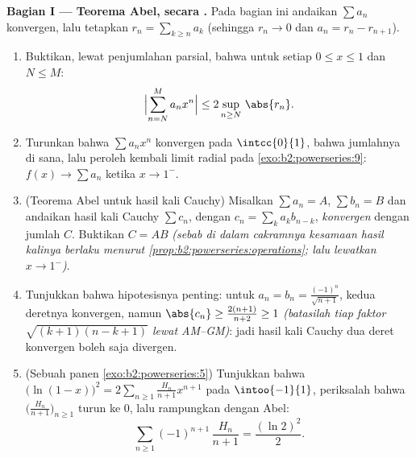 \begin{problem}
\medskip
\noindent\textbf{Bagian I --- Teorema Abel, secara .} Pada
bagian ini andaikan $\sum a_n$ konvergen, lalu tetapkan $r_n =
\sum_{k\geq n} a_k$ (sehingga $r_n \to 0$ dan $a_n = r_n - r_{n+1}$).
\begin{enumerate}
  \item Buktikan, lewat penjumlahan parsial, bahwa untuk setiap $0 \leq
        x \leq 1$ dan $N \leq M$:
        \[
        \Bigl|\sum_{n=N}^{M} a_n x^n\Bigr|
        \leq 2\sup_{n \geq N}\,\abs{r_n} .
        \]
  \item Turunkan bahwa $\sum a_nx^n$ konvergen \emph{} pada
        $\intcc{0}{1}$, bahwa jumlahnya  di sana, lalu
        peroleh kembali limit radial pada
        \cref{exo:b2:powerseries:9}: $f(x) \to \sum a_n$ ketika $x
        \to 1^-$.
  \item (Teorema Abel untuk hasil kali Cauchy) Misalkan $\sum a_n = A$,
        $\sum b_n = B$ dan andaikan hasil kali Cauchy $\sum
        c_n$, dengan $c_n = \sum_{k} a_kb_{n-k}$, \emph{konvergen}
        dengan jumlah $C$. Buktikan $C = AB$ \emph{(sebab di dalam
        cakramnya kesamaan hasil kalinya berlaku menurut
        \cref{prop:b2:powerseries:operations}; lalu lewatkan $x \to
        1^-$)}.
  \item Tunjukkan bahwa hipotesisnya penting: untuk $a_n = b_n =
        \frac{(-1)^n}{\sqrt{n+1}}$, kedua deretnya konvergen, namun
        $\abs{c_n} \geq \frac{2(n+1)}{n+2} \geq 1$ \emph{(batasilah
        tiap faktor $\sqrt{(k+1)(n-k+1)}$ lewat AM--GM)}: jadi
        hasil kali Cauchy dua deret konvergen boleh saja divergen.
  \item (Sebuah panen \cref{exo:b2:powerseries:5}) Tunjukkan bahwa
        $\bigl(\ln(1-x)\bigr)^2 = 2\sum_{n\geq1}
        \frac{H_n}{n+1}x^{n+1}$ pada $\intoo{-1}{1}$, periksalah bahwa
        $\bigl(\frac{H_n}{n+1}\bigr)_{n\geq1}$ turun ke
        $0$, lalu rampungkan dengan Abel:
        \[
        \sum_{n\geq1} (-1)^{n+1}\,\frac{H_n}{n+1}
        = \frac{(\ln 2)^2}{2} .
        \]
\end{enumerate}


\end{problem}
